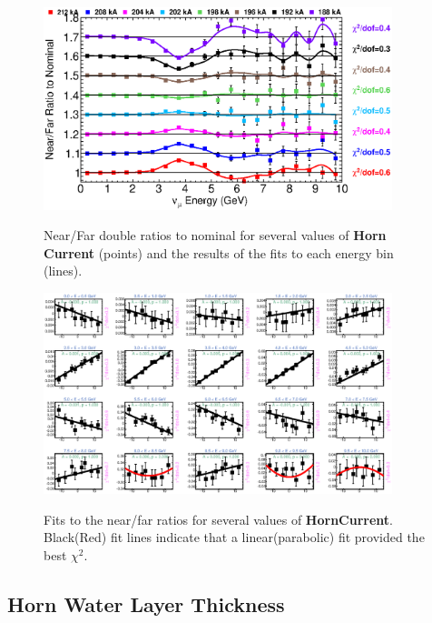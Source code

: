 \begin{figure}[ht]
  \begin{center}
    {\includegraphics[width=4.0in]{figures/HornCurrent_nof_summary.eps}}
  \end{center}
\caption{ Near/Far double ratios to nominal for several values of {\bf Horn Current} (points) and the results of the fits to each energy bin (lines).}
\end{figure}

\begin{figure}[hb]
  \begin{center}
    {\includegraphics[width=4.0in]{figures/HornCurrent_nof_fits.eps}}
  \end{center}
\caption{ Fits to the near/far ratios for several values of {\bf HornCurrent}. Black(Red) fit lines indicate that a linear(parabolic) fit provided the best $\chi^2$. }
\end{figure}

\clearpage
\subsection{Horn Water Layer Thickness}

